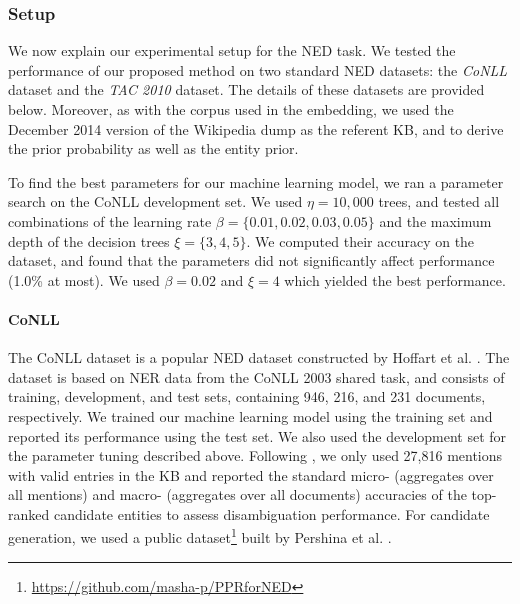 \documentclass[11pt,letterpaper]{article}
\begin{document}
\subsubsection{Setup}
\label{subsubsec:ned-setup}

We now explain our experimental setup for the NED task.
We tested the performance of our proposed method on two standard NED datasets: the \textit{CoNLL} dataset and the \textit{TAC 2010} dataset.
The details of these datasets are provided below.
Moreover, as with the corpus used in the embedding, we used the December 2014 version of the Wikipedia dump as the referent KB, and to derive the prior probability as well as the entity prior.

To find the best parameters for our machine learning model, we ran a parameter search on the CoNLL development set.
We used $\eta = 10,000$ trees, and tested all combinations of the learning rate $\beta = \{0.01, 0.02, 0.03, 0.05\}$ and the maximum depth of the decision trees $\xi = \{3, 4, 5\}$.
We computed their accuracy on the dataset, and found that the parameters did not significantly affect performance (1.0\% at most).
We used $\beta = 0.02$ and $\xi = 4$ which yielded the best performance.

\paragraph*{CoNLL}

The CoNLL dataset is a popular NED dataset constructed by Hoffart et al. \cite{Hoffart2011}.
The dataset is based on NER data from the CoNLL 2003 shared task, and consists of training, development, and test sets, containing 946, 216, and 231 documents, respectively.
We trained our machine learning model using the training set and reported its performance using the test set.
We also used the development set for the parameter tuning described above.
Following \cite{Hoffart2011}, we only used 27,816 mentions with valid entries in the KB and reported the standard micro- (aggregates over all mentions) and macro- (aggregates over all documents) accuracies of the top-ranked candidate entities to assess disambiguation performance.
For candidate generation, we used a public dataset\footnote{\url{https://github.com/masha-p/PPRforNED}} built by Pershina et al. \cite{pershina-he-grishman:2015:NAACL-HLT}.
\end{document}
